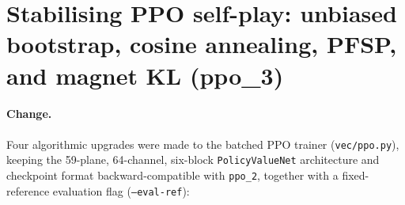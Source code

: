 \section{Stabilising PPO self-play: unbiased bootstrap, cosine annealing, PFSP, and magnet KL (ppo\_3)}
\label{sec:ppo3}

\paragraph{Change.} Four algorithmic upgrades were made to the batched PPO trainer
(\texttt{vec/ppo.py}), keeping the 59-plane, 64-channel, six-block \texttt{PolicyValueNet}
architecture and checkpoint format backward-compatible with \texttt{ppo\_2}, together with a
fixed-reference evaluation flag (\texttt{--eval-ref}):
